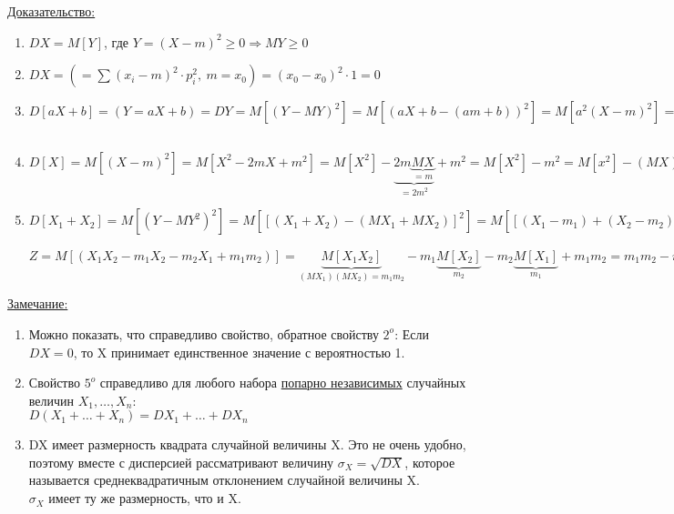 \underline{Доказательство:}
\begin{enumerate}
	\item[$1^o$] $DX = M[Y]$, где $Y = (X - m)^2 \geqslant 0 \Rightarrow MY \geqslant 0$
	
	\item[$2^o$] $DX = \left( = \sum (x_i - m)^2 \cdot p_i^2, \ m = x_0 \right) = (x_0 - x_0)^2 \cdot 1 = 0$
	
	\item[$3^o$] $D[aX + b] = \left(Y = aX + b \right) = DY = M\left[ (Y - MY)^2 \right] = M\left[ (aX + b - (am + b))^2 \right] = M\left[ a^2(X - m)^2 \right] = a^2 \underbrace{M\left[ (X - m)^2\right]}_{DX} = a^2 DX$ %
	
	\item[$4^o$] $D[X] = M\left[ (X - m)^2 \right] = M\left[ X^2 - 2mX + m^2 \right] = M[X^2] - \underbrace{2m \underbrace{MX}_{= m}}_{= 2m^2} + m^2 = M[X^2] - m^2 = M[x^2] - (MX)^2$ %
	
	\item[$5^o$] $D[X_1 + X_2] = M\left[(Y - MY^2)^2\right] = M \left[ \left[ (X_1 + X_2) - (MX_1 + MX_2) \right]^2 \right] = M\left[ \left[ (X_1 - m_1) + (X_2 - m_2)\right]^2\right] = M\left[ (X_1 - m_1)^2 + (X_2 - m_2)^2 + 2(X_1 - m_1)(X_2 - m_2)\right] = 
	\underbrace{M\left[(X_1 - m_1)^2\right]}_{DX_1} + \underbrace{M\left[(X_2 - m_2)^2\right]}_{DX_2} - \underbrace{2M\left[(X_1 - m_1)(X_2 - m_2)\right]}_{Z} = DX_1 + DX_2$ \\
	$Z = M\left[(X_1 X_2 - m_1 X_2 - m_2 X_1 + m_1 m_2)\right] = \underbrace{M[X_1 X_2]}_{(MX_1)(MX_2) = m_1 m_2} - m_1 \underbrace{M[X_2]}_{m_2} - m_2 \underbrace{M[X_1]}_{m_1} + m_1 m_2 = m_1 m_2 - m_1 m_2 - m_1 m_2 + m_1 m_2 = 0$
\end{enumerate}


\underline{Замечание:}
\begin{enumerate}
	\item[1)] Можно показать, что справедливо свойство, обратное свойству $2^o$: Если $DX = 0$, то X принимает единственное значение с вероятностью 1.
	
	\item[2)] Свойство $5^o$ справедливо для любого набора \underline{попарно независимых} случайных величин $X_1, \ldots, X_n$: \\
	$D(X_1 + \ldots + X_n) = DX_1 + \ldots + DX_n$
	
	\item[3)] DX имеет размерность квадрата случайной величины X. Это не очень удобно, поэтому вместе с дисперсией рассматривают величину $\sigma_X = \sqrt{DX}$, которое называется среднеквадратичным отклонением случайной величины X. \\
	$\sigma_X$ имеет ту же размерность, что и X.
\end{enumerate}


















